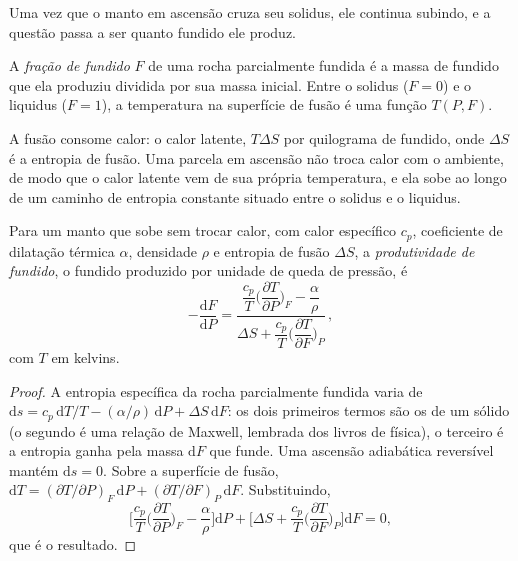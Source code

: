 Uma vez que o manto em ascensão cruza seu solidus, ele continua subindo, e a questão
passa a ser quanto fundido ele produz.

\begin{definition}\label{def:b2:mantle-melting:fraction}
A \emph{fração de fundido} $F$ de uma rocha parcialmente fundida é
a massa de fundido que ela produziu dividida por sua massa inicial. Entre o solidus
($F = 0$) e o liquidus ($F = 1$), a temperatura na superfície de fusão é uma
função $T(P, F)$.
\end{definition}

A fusão consome calor: o calor latente, $T\Delta S$ por quilograma de fundido, onde
$\Delta S$ é a entropia de fusão. Uma parcela em ascensão não troca calor com o
ambiente, de modo que o calor latente vem de sua própria temperatura, e ela sobe
ao longo de um caminho de entropia constante situado entre o solidus e o liquidus.

\begin{proposition}\label{prop:b2:mantle-melting:productivity}
Para um manto que sobe sem trocar calor, com calor específico $c_p$, coeficiente de
dilatação térmica $\alpha$, densidade $\rho$ e entropia de fusão $\Delta S$, a
\emph{produtividade de fundido}, o fundido produzido por unidade de queda de
pressão, é
\[
  -\frac{\mathrm dF}{\mathrm dP} =
  \frac{\dfrac{c_p}{T}\Big(\dfrac{\partial T}{\partial P}\Big)_F - \dfrac{\alpha}{\rho}}
       {\Delta S + \dfrac{c_p}{T}\Big(\dfrac{\partial T}{\partial F}\Big)_P}\,,
\]
com $T$ em kelvins.
\end{proposition}

\begin{proof}
A entropia específica da rocha parcialmente fundida varia de $\mathrm ds = c_p\,
\mathrm dT/T - (\alpha/\rho)\,\mathrm dP + \Delta S\,\mathrm dF$: os dois primeiros
termos são os de um sólido (o segundo é uma relação de Maxwell, lembrada dos
livros de física), o terceiro é a entropia ganha pela massa $\mathrm dF$ que
funde. Uma ascensão adiabática reversível mantém $\mathrm ds = 0$. Sobre a superfície
de fusão, $\mathrm dT = (\partial T/\partial P)_F\,\mathrm dP + (\partial
T/\partial F)_P\,\mathrm dF$. Substituindo,
\[
  \Big[\frac{c_p}{T}\Big(\frac{\partial T}{\partial P}\Big)_F - \frac{\alpha}{\rho}\Big]\mathrm dP
  + \Big[\Delta S + \frac{c_p}{T}\Big(\frac{\partial T}{\partial F}\Big)_P\Big]\mathrm dF = 0,
\]
que é o resultado.
\end{proof}

